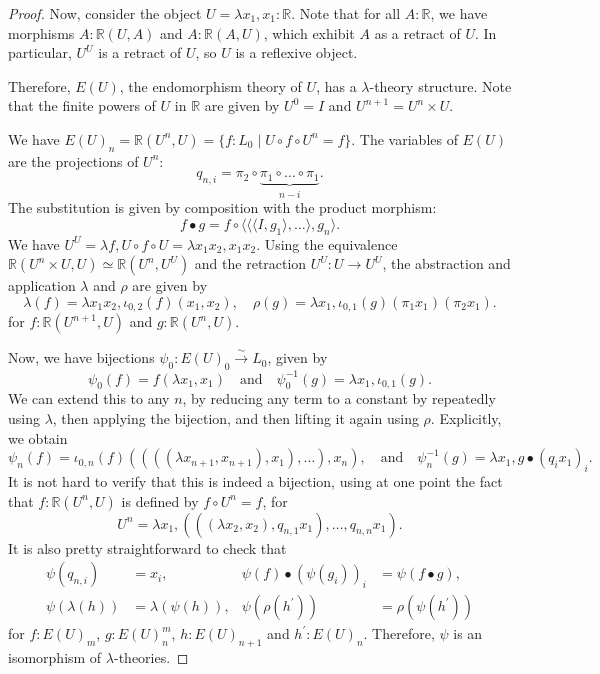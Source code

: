 \begin{proof}
  Now, consider the object $ U = \lambda x_1, x_1 : \mathbb R $. Note that for all $ A: \mathbb R $, we have morphisms $ A: \mathbb R(U, A) $ and $ A: \mathbb R(A, U) $, which exhibit $ A $ as a retract of $ U $. In particular, $ U^U $ is a retract of $ U $, so $ U $ is a reflexive object.

  Therefore, $ E(U) $, the endomorphism theory of $ U $, has a $ \lambda $-theory structure. Note that the finite powers of $ U $ in $ \mathbb R $ are given by $ U^0 = I $ and $ U^{n + 1} = U^n \times U $.

  We have $ E(U)_n = \mathbb R(U^n, U) = \{ f: L_0 \mid U \circ f \circ U^n = f \} $. The variables of $ E(U) $ are the projections of $ U^n $:
  \[ q_{n, i} = \pi_2 \circ \underbrace{\pi_1 \circ \dots \circ \pi_1}_{n - i}. \]
  The substitution is given by composition with the product morphism:
  \[ f \bullet g = f \circ \langle \langle \langle I, g_1 \rangle, \dots \rangle, g_n \rangle. \]
  We have $ U^U = \lambda f, U \circ f \circ U = \lambda x_1 x_2, x_1 x_2 $. Using the equivalence $ \mathbb R(U^n \times U, U) \simeq \mathbb R(U^n, U^U) $ and the retraction $ U^U: U \to U^U $, the abstraction and application $ \lambda $ and $ \rho $ are given by
  \[ \lambda(f) = \lambda x_1 x_2, \iota_{0, 2}(f)(x_1, x_2), \quad \rho(g) = \lambda x_1, \iota_{0, 1}(g) (\pi_1 x_1) (\pi_2 x_1). \]
  for $ f: \mathbb R(U^{n + 1}, U) $ and $ g: \mathbb R(U^n, U) $.

  Now, we have bijections $ \psi_0: E(U)_0 \xrightarrow{\sim} L_0 $, given by
  \[ \psi_0(f) = f (\lambda x_1, x_1) \quad \text{and} \quad \psi_0^{-1}(g) = \lambda x_1, \iota_{0, 1}(g). \]
  We can extend this to any $ n $, by reducing any term to a constant by repeatedly using $ \lambda $, then applying the bijection, and then lifting it again using $ \rho $. Explicitly, we obtain
  \[ \psi_n(f) = \iota_{0, n}(f) ((((\lambda x_{n+1}, x_{n+1}), x_1), \dots), x_n), \quad \text{and} \quad \psi^{-1}_n(g) = \lambda x_1, g \bullet (q_i x_1)_i. \]
  It is not hard to verify that this is indeed a bijection, using at one point the fact that $ f: \mathbb R(U^n, U) $ is defined by $ f \circ U^n = f $, for
  \[ U^n = \lambda x_1, (((\lambda x_2, x_2), q_{n, 1} x_1 ), \dots, q_{n, n} x_1 ). \]
  It is also pretty straightforward to check that
  \begin{align*}
    \psi(q_{n, i}) &= x_i, & \psi(f) \bullet (\psi(g_i))_i &= \psi(f \bullet g),\\
    \psi(\lambda(h)) &= \lambda(\psi(h)), & \psi(\rho(h^\prime)) &= \rho(\psi(h^\prime))
  \end{align*}
  for $ f: E(U)_m $, $ g: E(U)_n^m $, $ h: E(U)_{n + 1} $ and $ h^\prime : E(U)_n $. Therefore, $ \psi $ is an isomorphism of $ \lambda $-theories.
\end{proof}

